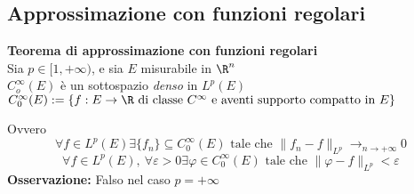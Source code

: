 \subsection{Approssimazione con funzioni regolari}
\begin{tcolorbox}
	\textbf{Teorema di approssimazione con funzioni regolari}\\
	Sia $p\in[1,+\infty)$, e sia $E$ misurabile in $\R^n$
	\\$C_o^\infty(E)$ è un sottospazio \textit{denso} in $L^p(E)$
	\\$C_0^\infty(E):=\{f:E\to \R\text{ di classe }C^\infty \text{ e aventi supporto compatto in }E\}$ 
\end{tcolorbox}
Ovvero 
\[\forall f\in L^p(E) \exists \{f_n\} \subseteq C_0^\infty(E)\text{ tale che }\|f_n-f\|_{L^p}\to_{n\to +\infty}0\]
\[\forall f\in L^p(E),\ \forall \varepsilon>0 \exists \varphi\in C_0^\infty(E)\text{ tale che }\|\varphi-f\|_{L^p}<\varepsilon\]
\textbf{Osservazione:} Falso nel caso $p=+\infty$



